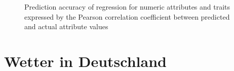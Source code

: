 \documentclass[
  a4paper,
]{scrbook}
\theoremstyle{definition}
\theoremstyle{definition}
\theoremstyle{definition}
\theoremstyle{remark}
\begin{document}
\begin{figure}


\caption{\label{fig-pnas1}Prediction accuracy of regression for numeric
attributes and traits expressed by the Pearson correlation coefficient
between predicted and actual attribute values}

\end{figure}%

\section{Wetter in Deutschland}\label{wetter-in-deutschland}
\end{document}
